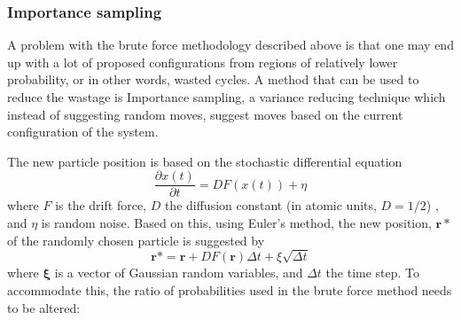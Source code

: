 \documentclass[%
oneside,                 %
final,                   %
10pt]{article}
\begin{document}
\begin{center}\end{center}
\subsubsection{Importance sampling} \label{importance_sampling}
A problem with the brute force methodology described above is that one may end up with a lot of proposed configurations from regions of relatively lower probability, or in other words, wasted cycles. A method that can be used to reduce the wastage is Importance sampling, a variance reducing technique which instead of suggesting random moves, suggest moves based on the current configuration of the system.

The new particle position is based on the stochastic differential equation
\begin{equation}
\frac{\partial x(t)}{\partial t}=DF(x(t)) + \eta
\end{equation}
where $F$ is the drift force, $D$ the diffusion constant (in atomic units, $D=1/2$) , and $\eta$ is random noise. Based on this, using Euler's method, the new position, $\bm r*$ of the randomly chosen particle is suggested by
\begin{equation}
\bm r*=\bm r+DF(\bm r)\Delta t + \xi \sqrt{\Delta t}
\end{equation}
where $\bm \xi $ is a vector of Gaussian random variables, and $\Delta t$ the time step. To accommodate this, the ratio of probabilities used in the brute force method needs to be altered: 
\end{document}
